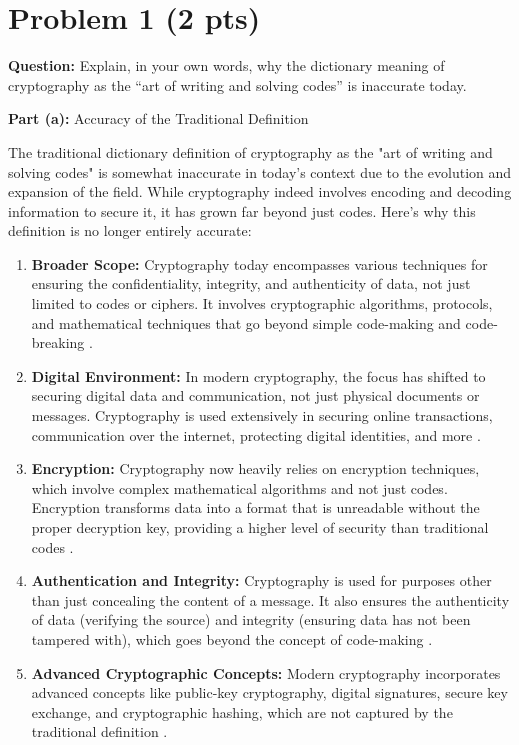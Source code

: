 \documentclass{article}
\begin{document}
\section*{Problem 1 (2 pts)}

\textbf{Question:} 
Explain, in your own words, why the dictionary meaning of cryptography as the “art of writing and solving codes” is inaccurate today.

\textbf{Part (a):} Accuracy of the Traditional Definition

The traditional dictionary definition of cryptography as the "art of writing and solving codes" is somewhat inaccurate in today's context due to the evolution and expansion of the field. While cryptography indeed involves encoding and decoding information to secure it, it has grown far beyond just codes. Here's why this definition is no longer entirely accurate:

\begin{enumerate}[label=\alph*)]
    \item \textbf{Broader Scope:} Cryptography today encompasses various techniques for ensuring the confidentiality, integrity, and authenticity of data, not just limited to codes or ciphers. It involves cryptographic algorithms, protocols, and mathematical techniques that go beyond simple code-making and code-breaking \cite{stallings2017cryptography}.

    \item \textbf{Digital Environment:} In modern cryptography, the focus has shifted to securing digital data and communication, not just physical documents or messages. Cryptography is used extensively in securing online transactions, communication over the internet, protecting digital identities, and more \cite{schneier2015applied}.

    \item \textbf{Encryption:} Cryptography now heavily relies on encryption techniques, which involve complex mathematical algorithms and not just codes. Encryption transforms data into a format that is unreadable without the proper decryption key, providing a higher level of security than traditional codes \cite{katz2014introduction}.

    \item \textbf{Authentication and Integrity:} Cryptography is used for purposes other than just concealing the content of a message. It also ensures the authenticity of data (verifying the source) and integrity (ensuring data has not been tampered with), which goes beyond the concept of code-making \cite{ferguson2010cryptography}.

    \item \textbf{Advanced Cryptographic Concepts:} Modern cryptography incorporates advanced concepts like public-key cryptography, digital signatures, secure key exchange, and cryptographic hashing, which are not captured by the traditional definition \cite{paar2010understanding}.
\end{enumerate}
\end{document}
